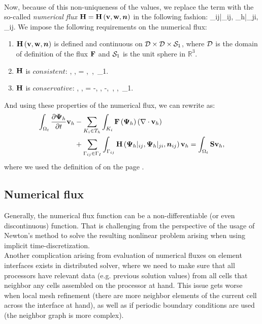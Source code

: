 \paragraph{}
Now, because of this non-uniqueness of the values, we replace the term  with the so-called \textit{numerical flux} $\mathrm{\mathbf{H}} = \mathrm{\mathbf{H}}\left(\mathrm{\mathbf{v}}, \mathrm{\mathbf{w}}, \mbox{\boldmath $n$}\right)$ in the following fashion:
\be
\label{NumFluxDef}
\lo\mrF{}\ro \cdot \bfn_{ij}\ro \mrvh \approx \mrH{}|_{ij}, {\mrPsi_h}|_{ji}, \bfn_{ij}\ro \mrvh.
\ee
We impose the following requirements on the numerical flux:
\begin{enumerate}
	\item $\mathrm{\mathbf{H}}\left( \mathrm{\mathbf{v}}, \mathrm{\mathbf{w}}, \mbox{\boldmath $n$}\right)$ is defined and continuous on $\mathcal{D} \times \mathcal{D} \times \mathcal{S}_1$, where $\mathcal{D}$ is the domain of definition of the flux $\mathrm{\mathbf{F}}$ and $\mathcal{S}_1$ is the unit sphere in $\mathbb{R}^3$.
	\item $\mathrm{\mathbf{H}}$ is $consistent$:
		\be
			\label{FluxConsistent} \mrH\lo \mrv, \mrv, \bfn\ro = \mrF\lo \mrv\ro \bfn,\ \mrv\in{},\ \bfn\in{}_1.
		\ee
	\item $\mathrm{\mathbf{H}}$ is $conservative$:
		\be
			\label{FluxConservative} \mrH\lo \mrv, \mrw, \bfn\ro = -\mrH\lo \mrw, \mrv, -\bfn\ro,\ \mrv, \mrw\in{},\ \bfn\in{}_1.
		\ee
 \end{enumerate}

And using these properties of the numerical flux, we can rewrite  as:
\begin{align}
    \label{DG2} \int_{\Omega_{t}} \frac{\partial{{\mathrm{\mathbf{\Psi}}_h}}}{\partial{t}} \mathrm{\mathbf{v}}_h & - \sum_{K_i \in T_h}\int_{K_i}\mathrm{\mathbf{F}}\left({\mathrm{\mathbf{\Psi}}_h}\right) \left(\nabla \cdot \mathrm{\mathbf{v}}_h\right)\\
    \nonumber & + \sum_{\Gamma_{ij}\in\Gamma_I} \int_{\Gamma_{ij}} \mathrm{\mathbf{H}}\left({\mathrm{\mathbf{\Psi}}_h}|_{ij}, {\mathrm{\mathbf{\Psi}}_h}|_{ji}, \mbox{\boldmath $n$}_{ij}\right) \mathrm{\mathbf{v}}_h = \int_{\Omega_{t}} \mathrm{\mathbf{S}} \mathrm{\mathbf{v}}_h,
\end{align}
where we used the definition of  on the page \pageref{InternalEdges}.
\subsection{Numerical flux}
Generally, the numerical flux function can be a non-differentiable (or even discontinuous) function. That is challenging from the perspective of the usage of Newton's method to solve the resulting nonlinear problem arising when using implicit time-discretization.\ \\
Another complication arising from evaluation of numerical fluxes on element interfaces exists in distributed solver, where we need to make sure that all processors have relevant data (e.g. previous solution values) from all cells that neighbor any cells assembled on the processor at hand. This issue gets worse when local mesh refinement (there are more neighbor elements of the current cell across the interface at hand), as well as if periodic boundary conditions are used (the neighbor graph is more complex).
